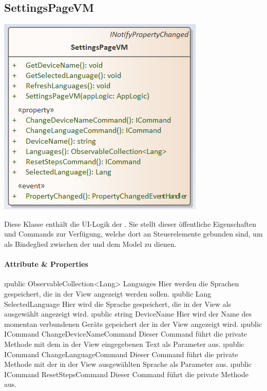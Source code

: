 \documentclass[../entwurf.tex]{subfiles}
\begin{document}
\subsection{SettingsPageVM}
\begin{minipage}{0.55\textwidth}
\includegraphics[scale=0.75]{../graphics/vm_klassen/SettingsPageVM.png}
\end{minipage}
\begin{minipage}{0.45\textwidth}
Diese Klasse enthält die UI-Logik der . Sie stellt dieser öffentliche Eigenschaften und Commands zur Verfügung, welche dort an Steuerelemente gebunden sind, um als Bindeglied zwischen der  und dem Model zu dienen.
\end{minipage}
\paragraph{Attribute \& Properties}
\begin{itemize} 
	\i{public ObservableCollection<Lang> Languages} Hier werden die Sprachen gespeichert, die in der View angezeigt werden sollen.
	\i{public Lang SelectedLanguage} Hier wird die Sprache gespeichert, die in der View als ausgewählt angezeigt wird.
	\i{public string DeviceName} Hier wird der Name des momentan verbundenen Geräts gepeichert der in der View angezeigt wird.
	\i{public ICommand ChangeDeviceNameCommand} Dieser Command führt die private Methode  mit dem in der View eingegebenen Text als Parameter aus. 
	\i{public ICommand ChangeLanguageCommand} Dieser Command führt die private Methode  mit der in der View ausgewählten Sprache als Parameter aus. 
	\i{public ICommand ResetStepsCommand} Dieser Command führt die private Methode  aus. 
\end{itemize}
\end{document}
